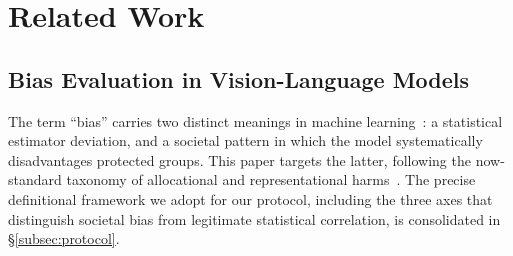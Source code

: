 \documentclass[lettersize,journal]{IEEEtran}
\begin{document}
\section{Related Work}

\subsection{Bias Evaluation in Vision-Language Models}
\label{subsec:bias_foundations}
The term ``bias'' carries two distinct meanings in machine learning~\cite{mehrabi2021survey}: a statistical estimator deviation, and a societal pattern in which the model systematically disadvantages protected groups.
This paper targets the latter, following the now-standard taxonomy of allocational and representational harms~\cite{blodgett2020language,barocas2016big}.
The precise definitional framework we adopt for our protocol, including the three axes that distinguish societal bias from legitimate statistical correlation, is consolidated in \S\ref{subsec:protocol}.
\end{document}
